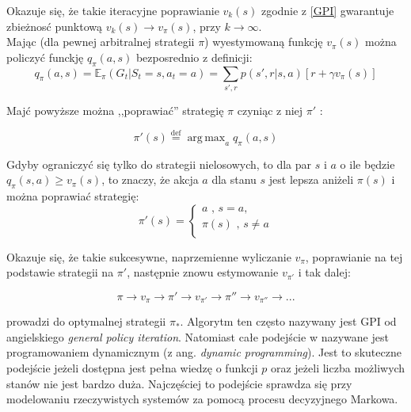 \documentclass[licencjacka]{pracamgr}
\DeclareMathOperator*{\argmax}{arg\,max}
\begin{document}
Okazuje się, że takie iteracyjne poprawianie $v_{k}(s)$ zgodnie z \ref{GPI} gwarantuje zbieżnosć punktową $v_{k}(s)\rightarrow v_{\pi}(s)$, przy $k\rightarrow\infty$.\\

Mając (dla pewnej arbitralnej strategii $\pi$) wyestymowaną funkcję $v_{\pi}(s)$  można policzyć  funckję $q_{\pi}(a,s)$ bezposrednio z definicji:
$$q_{\pi}(a,s)=\mathbb{E}_{\pi}(G_{t}| S_{t} = s, a_{t} = a)  =  \sum_{s',r}p(s',r|s, a)[r+\gamma v_{\pi}(s)]$$

Majć powyższe można  ,,poprawiać'' strategię $\pi$ czyniąc z niej $\pi'$ : 

\begin{equation}\label{update1}
	\pi'(s)\stackrel{\text{def}}{=}\argmax_{a}q_{\pi}(a,s)
\end{equation}


Gdyby ograniczyć się tylko do strategii nielosowych, to dla par  $s$ i $a$ o ile będzie $q_{\pi}(s,a)\geq v_{\pi}(s)$, to znaczy, że akcja $a$  dla stanu $s$ jest lepsza aniżeli $\pi(s)$ i można poprawiać strategię: 
$$\pi'(s) =
	\begin{cases}
		a\text{ ,  }s=a,\\			
		\pi(s)\text{ , } s\neq a\\
	\end{cases}
$$

Okazuje się, że takie sukcesywne, naprzemienne wyliczanie $v_{\pi}$, poprawianie na tej podstawie strategii na $\pi'$, następnie znowu estymowanie $v_{\pi'}$ i tak dalej:

\begin{equation}\label{update2}
 	\pi\rightarrow v_{\pi}\rightarrow \pi' \rightarrow v_{\pi'} \rightarrow \pi'' \rightarrow v_{\pi''} \rightarrow...
\end{equation}


prowadzi do optymalnej strategii $\pi_{*}$.  Algorytm ten często nazywany jest GPI od angielskiego \textit{general policy iteration}. Natomiast całe podejście w \cite{RL} nazywane jest programowaniem dynamicznym (z ang. \textit{dynamic programming}). Jest to skuteczne podejście jeżeli dostępna jest  pełna wiedzę o funkcji $p$ oraz jeżeli liczba możliwych stanów nie jest bardzo duża. Najczęściej to podejście sprawdza się przy modelowaniu rzeczywistych systemów za pomocą procesu decyzyjnego Markowa.\\
\end{document}
